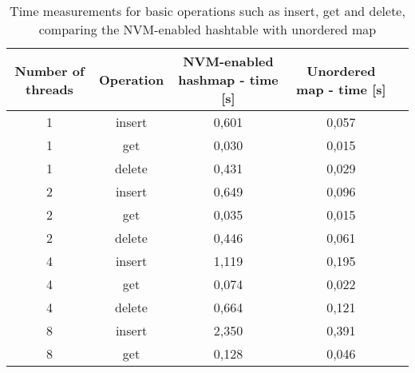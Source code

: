 
        \begin{table}[ht]
            \caption{Time measurements for basic operations such as insert, get and delete, comparing the NVM-enabled hashtable with unordered map}\label{tab:tabela}
            \centering\footnotesize%
            \begin{tabular}{|c|c|c|c|c}
                \hline
                Number of threads & Operation & NVM-enabled hashmap - time {[}s{]} & Unordered map - time {[}s{]}   \\
                \hline
                1                 & insert    & 0,601                              & 0,057                          \\
                1                 & get       & 0,030                              & 0,015                          \\
                1                 & delete    & 0,431                              & 0,029                          \\
                \hline
                2                 & insert    & 0,649                              & 0,096                          \\
                2                 & get       & 0,035                              & 0,015                          \\
                2                 & delete    & 0,446                              & 0,061                          \\
                \hline
                4                 & insert    & 1,119                              & 0,195                          \\
                4                 & get       & 0,074                              & 0,022                          \\
                4                 & delete    & 0,664                              & 0,121                          \\
                \hline
                8                 & insert    & 2,350                              & 0,391                          \\
                8                 & get       & 0,128                              & 0,046                          \\

\end{tabular}
\end{table}
